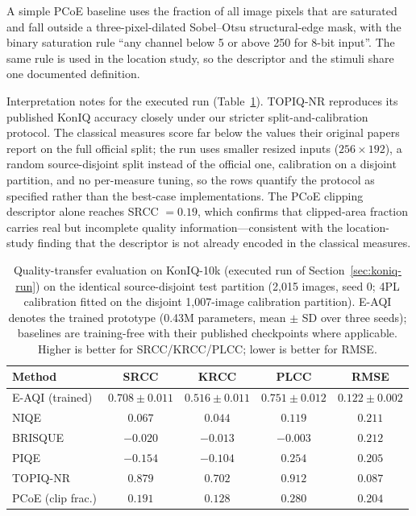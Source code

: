 \documentclass[5p,times,twocolumn]{elsarticle}
\begin{document}
A simple PCoE baseline uses the fraction of all image pixels that are
saturated and fall outside a three-pixel-dilated Sobel--Otsu structural-edge
mask, with the binary saturation rule ``any channel below 5 or above 250 for
8-bit input''. The same rule is used in the location study, so the descriptor
and the stimuli share one documented definition.

Interpretation notes for the executed run (Table~\ref{tab:koniq}). TOPIQ-NR
reproduces its published KonIQ accuracy closely under our stricter
split-and-calibration protocol. The classical measures score far below the
values their original papers report on the full official split; the run uses
smaller resized inputs ($256 \times 192$), a random source-disjoint split
instead of the official one, calibration on a disjoint partition, and no
per-measure tuning, so the rows quantify the protocol as specified rather
than the best-case implementations. The PCoE clipping descriptor alone
reaches SRCC $= 0.19$, which confirms that clipped-area fraction carries
real but incomplete quality information---consistent with the
location-study finding that the descriptor is not already encoded in the
classical measures.

\begin{table}[t]
\centering
\caption{Quality-transfer evaluation on KonIQ-10k (executed run of
Section~\ref{sec:koniq-run}) on the identical source-disjoint test partition
(2{,}015 images, seed 0; 4PL calibration fitted on the disjoint 1{,}007-image
calibration partition). E-AQI denotes the trained prototype (0.43M
parameters, mean $\pm$ SD over three seeds); baselines are training-free
with their published checkpoints where applicable. Higher is better for
SRCC/KRCC/PLCC; lower is better for RMSE.}
\label{tab:koniq}
\footnotesize
\setlength{\tabcolsep}{2.6pt}
\begin{tabular}{@{}lcccc@{}}
\toprule
Method & SRCC & KRCC & PLCC & RMSE \\
\midrule
E-AQI (trained) & $0.708 \pm 0.011$ & $0.516 \pm 0.011$ & $0.751 \pm 0.012$ & $0.122 \pm 0.002$ \\
NIQE & $0.067$ & $0.044$ & $0.119$ & $0.211$ \\
BRISQUE & $-0.020$ & $-0.013$ & $-0.003$ & $0.212$ \\
PIQE & $-0.154$ & $-0.104$ & $0.254$ & $0.205$ \\
TOPIQ-NR & $0.879$ & $0.702$ & $0.912$ & $0.087$ \\
PCoE (clip frac.) & $0.191$ & $0.128$ & $0.280$ & $0.204$ \\
\bottomrule
\end{tabular}
\end{table}
\end{document}
